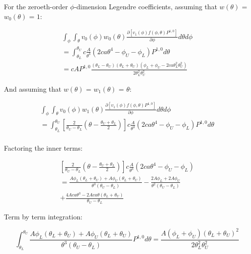 \documentclass[12pt,a4paper,pagesize=pdftex]{scrartcl}
\begin{document}
For the zeroeth-order \(\phi\)-dimension Legendre coefficients, assuming that \(w\left(\theta\right)\) = \(w_0\left(\theta\right)\) = \(1\):

\begin{multline*}
    \int_\phi \int_\theta v_0\left(\phi\right) w_0\left(\theta\right) \frac{\partial \left[v_1\left(\phi\right) f\left(\phi, \theta\right) P^{1,0}\right]}{\partial \phi} d\theta d\phi \\
    = \int_{\theta_L}^{\theta_U} c \frac{A}{\theta^3} \left(2 c a \theta^4 - \phi_U - \phi_L\right) P^{1,0} d\theta \\
    = c A P^{1,0} \frac{\left(\theta_L - \theta_U\right)\left(\theta_L + \theta_U\right) \left(\phi_L + \phi_U - 2ca \theta_L^2 \theta_U^2\right)}{2 \theta_L^2 \theta_U^2}
\end{multline*}

And assuming that \(w\left(\theta\right)\) = \(w_1\left(\theta\right)\) = \(\theta\):

\begin{multline*}
    \int_\phi \int_\theta v_0\left(\phi\right) w_1\left(\theta\right) \frac{\partial \left[v_1\left(\phi\right) f\left(\phi, \theta\right) P^{1,0}\right]}{\partial \phi} d\theta d\phi \\
    = \int_{\theta_L}^{\theta_U} \left[\frac{2}{\theta_U - \theta_L} \left(\theta - \frac{\theta_U + \theta_L}{2}\right)\right] c \frac{A}{\theta^3} \left(2 c a \theta^4 - \phi_U - \phi_L\right) P^{1,0} d\theta \\
\end{multline*}

Factoring the inner terms:

\begin{multline*}
    \left[\frac{2}{\theta_U - \theta_L} \left(\theta - \frac{\theta_U + \theta_L}{2}\right)\right] c \frac{A}{\theta^3} \left(2 c a \theta^4 - \phi_U - \phi_L\right) \\
    = \frac{A \phi_L \left(\theta_L + \theta_U\right) + A \phi_U \left(\theta_L + \theta_U\right)}{\theta^3 \left(\theta_U - \theta_L\right)} - \frac{2 A \phi_L + 2 A \phi_U}{\theta^2 \left(\theta_U - \theta_L\right)} \\
    + \frac{4 A c a \theta^3 - 2 A c a \theta \left(\theta_L + \theta_U\right)}{\theta_U - \theta_L}
\end{multline*}

Term by term integration:

\begin{equation*}
    \int_{\theta_L}^{\theta_U} \frac{A \phi_L \left(\theta_L + \theta_U\right) + A \phi_U \left(\theta_L + \theta_U\right)}{\theta^3 \left(\theta_U - \theta_L\right)} P^{1,0} d\theta = \frac{A \left(\phi_L + \phi_U\right) \left(\theta_L + \theta_U\right)^2}{2 \theta_L^2 \theta_U^2}
\end{equation*}
\end{document}
